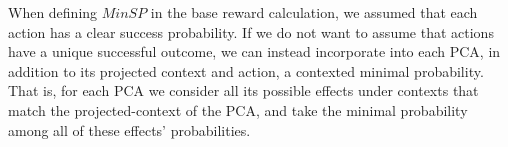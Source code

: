 {%

When defining $MinSP$ in the base reward calculation, we assumed that each action has a clear success probability. If we do not want to assume that actions have a unique successful outcome, we can instead incorporate into each PCA, in addition to its projected context and action, a contexted minimal probability. That is, for each PCA we consider all its possible effects under contexts that match the projected-context of the PCA, and take the minimal probability among all of these effects' probabilities.

}
